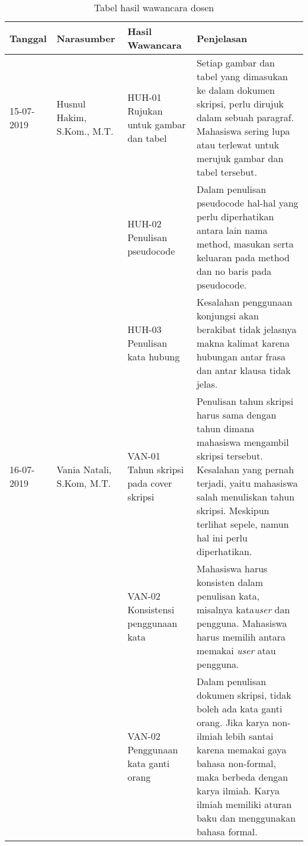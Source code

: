 \begin{table}[H]
	\caption {Tabel hasil wawancara dosen} \label{tab:hasil_wawancara2}
	\begin{center}
		\begin{tabular}{|p{2 cm}|>{\raggedright} p{3.5 cm}| p{4 cm}| p{5 cm}|}
		\hline
		Tanggal & Narasumber & Hasil Wawancara & Penjelasan \\ 
		\hline
		15-07-2019 & Husnul Hakim, S.Kom., M.T. & HUH-01 \newline Rujukan untuk gambar dan tabel & Setiap gambar dan tabel yang dimasukan ke dalam dokumen skripsi, perlu dirujuk dalam sebuah paragraf. Mahasiswa sering lupa atau terlewat untuk merujuk gambar dan tabel tersebut. \newline \\ 
		\hline
		 & & HUH-02 \newline Penulisan pseudocode & Dalam penulisan pseudocode hal-hal yang perlu diperhatikan antara lain nama method, masukan serta keluaran pada method dan no baris pada pseudocode.	 \newline \\ 
		\hline
		 & & HUH-03 \newline Penulisan kata hubung & Kesalahan penggunaan konjungsi akan berakibat tidak jelasnya makna kalimat karena hubungan antar frasa dan antar klausa tidak jelas. \newline \\ 
		\hline
		
		16-07-2019 & Vania Natali, S.Kom, M.T. & VAN-01 \newline Tahun skripsi pada cover skripsi & Penulisan tahun skripsi harus sama dengan tahun dimana mahasiswa mengambil skripsi tersebut. Kesalahan yang pernah terjadi, yaitu mahasiswa salah menuliskan tahun skripsi. Meskipun terlihat sepele, namun hal ini perlu diperhatikan.			 \newline \\ 
		\hline
		 & & VAN-02 \newline Konsistensi penggunaan kata & Mahasiswa harus konsisten dalam penulisan kata, misalnya kata\textit{user} dan pengguna.  Mahasiswa harus memilih antara memakai \textit{user} atau pengguna. \newline \\ 
		\hline
		 & & VAN-02 \newline Penggunaan kata ganti orang & Dalam penulisan dokumen skripsi, tidak boleh ada kata ganti orang. Jika karya non-ilmiah lebih santai karena memakai gaya bahasa non-formal, maka berbeda dengan karya ilmiah. Karya ilmiah memiliki aturan baku dan menggunakan bahasa formal.  \newline \\ 
		\hline
		\end{tabular}
	\end{center}
\end{table}

